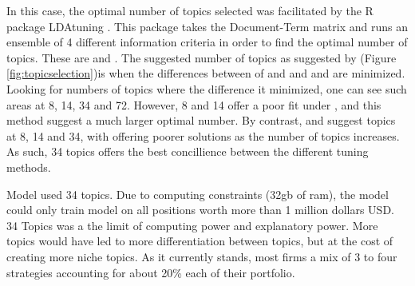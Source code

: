 In this case, the optimal number of topics selected was facilitated by the R package LDAtuning \citep{LDAtuning}. This package takes the Document-Term matrix and runs an ensemble of 4 different information criteria in order to find the optimal number of topics.  These are \cite{Arun2010} \cite{CAO2009} \cite{Griffiths2004} and \cite{deveaud2014}.  The suggested number of topics as suggested by \cite{LDAtuning} (Figure \ref{fig:topicselection})is when the differences between of \cite{CAO2009} and \cite{Arun2010} and \cite{Griffiths2004} and \cite{deveaud2014} are minimized.  Looking for numbers of topics where the difference it minimized, one can see such areas at 8, 14, 34 and 72.   However, 8 and 14 offer a poor fit under \cite{Griffiths2004}, and this method suggest a much larger optimal number.  By contrast, \cite{CAO2009} and \cite{deveaud2014} suggest topics at 8, 14 and 34, with \cite{deveaud2014} offering poorer solutions as the number of topics increases.  As such, 34 topics offers the best concillience between the different  tuning methods. 

Model used 34 topics. Due to computing constraints (32gb of ram), the model could only train model on all positions worth more than 1 million dollars USD.  34 Topics was a the limit of computing power and explanatory power.  More topics would have led to more differentiation between topics, but at the cost of creating more niche topics.  As it currently stands, most firms a mix of 3 to four strategies accounting for about 20\% each of their portfolio. 
	
